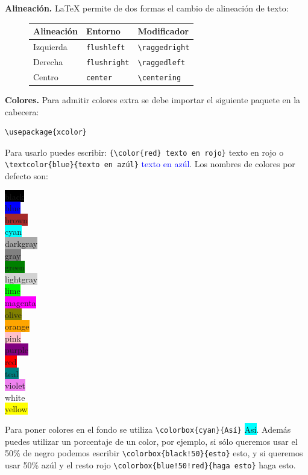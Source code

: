 \textbf{Alineación.} \LaTeX{} permite de dos formas el cambio de alineación de texto:
\begin{figure}[!h]
	\centering
	\begin{tabular}{lll}
		\hline \hline
		Alineación & Entorno             & Modificador \\
		\hline
		Izquierda  & \texttt{flushleft}  & \lstinline|\raggedright| \\
		Derecha    & \texttt{flushright} & \lstinline|\raggedleft| \\
		Centro     & \texttt{center}     & \lstinline|\centering| \\
		\hline \hline
	\end{tabular}
\end{figure}

\textbf{Colores.} Para admitir colores extra se debe importar el siguiente paquete en la cabecera:
\begin{lstlisting}
\usepackage{xcolor}
\end{lstlisting}
Para usarlo puedes escribir: \lstinline|{\color{red} texto en rojo}| {\color{red} texto en rojo} o\break
\lstinline|\textcolor{blue}{texto en azúl}| \textcolor{blue}{texto en azúl}. Los nombres de colores por defecto son:
\begin{multicols}{5}
	\noindent\ttfamily
	\colorbox{black}{\color{white} black}\\
	\colorbox{blue}{\color{white} blue}\\
	\colorbox{brown}{brown}\\
	\colorbox{cyan}{cyan}\\
	\colorbox{darkgray}{\color{white} darkgray}\\
	\colorbox{gray}{gray}\\
	\colorbox{green}{green}\\
	\colorbox{lightgray}{lightgray}\\
	\colorbox{lime}{lime}\\
	\colorbox{magenta}{magenta}\\
	\colorbox{olive}{olive}\\
	\colorbox{orange}{orange}\\
	\colorbox{pink}{pink}\\
	\colorbox{purple}{\color{white} purple}\\
	\colorbox{red}{red}\\
	\colorbox{teal}{teal}\\
	\colorbox{violet}{\color{white} violet}\\
	\colorbox{white}{white}\\
	\colorbox{yellow}{yellow}
\end{multicols}
Para poner colores en el fondo se utiliza \lstinline|\colorbox{cyan}{Así}| \colorbox{cyan}{Así}. Además puedes utilizar un porcentaje de un color, por ejemplo, si sólo queremos usar el 50\% de negro podemos escribir \lstinline|\colorbox{black!50}{esto}| \colorbox{black!50}{esto}, y si queremos usar 50\% azúl y el resto rojo \lstinline|\colorbox{blue!50!red}{haga esto}| \colorbox{blue!50!red}{haga esto}.

